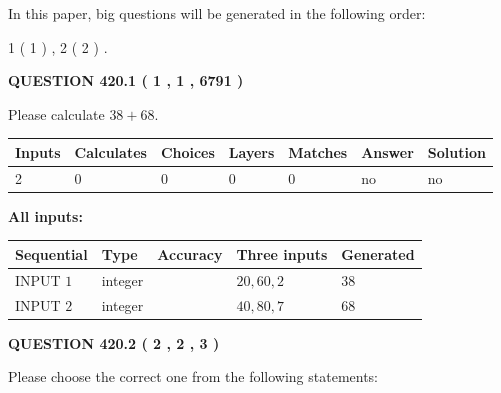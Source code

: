 \documentclass[12pt]{article}
\begin{document}
\vspace{0.2in}
   
In this paper, big questions will be generated in the following order: 
   
   
   1 ( 1 )
 ,
   2 ( 2 )
 .
  
\vspace{0.2in}
  
{\textbf{\Large{QUESTION
420.1 
 ( 1 , 1 , 6791 )
}}}
  
  
 
Please calculate $ %
38 +  %
68 $.
 
 
   
   
   
   
\noindent\begin{tabular}{|l|l|l|l|l|l|l|}
 \hline
Inputs & Calculates & Choices & Layers & Matches & Answer & Solution \\ \hline
 2  & 
 0  & 
 0
  & 
 0  & 
 0  & 
  no & 
  no 
  \\ \hline
 \end{tabular}
   
   
   
   
\noindent{}
   
   
   
   
\noindent\vspace{0.1in}\hspace{-0.08in} {\textbf{\Large{All inputs: }}}
   
   
  
  
\noindent\begin{tabular}{|l|l|l|l|l|}
\hline
 Sequential & Type & Accuracy & Three inputs & Generated \\ 
\hline
 
 
  INPUT $  1 $ & integer &  & $
 20
 , 
 60
 , 
 2
 $ & $ 38 $ 
 \\  \hline  
 
 
  INPUT $  2 $ & integer &  & $
 40
 , 
 80
 , 
 7
 $ & $ 68 $ 
 \\  \hline  
 \end{tabular}
   
   
  
\vspace{0.2in}
  
{\textbf{\Large{QUESTION
420.2 
 ( 2 , 2 , 3 )
}}}
  
  
Please choose the correct one from the following statements:
 
\end{document}
